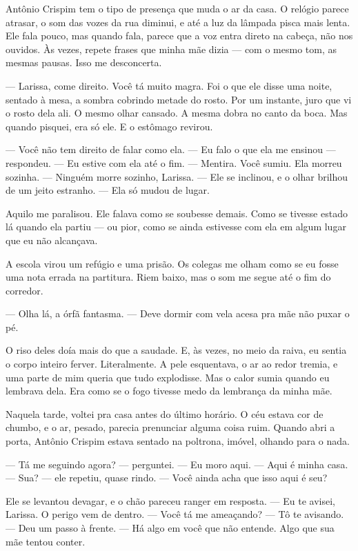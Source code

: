 Antônio Crispim tem o tipo de presença que muda o ar da casa.  
O relógio parece atrasar, o som das vozes da rua diminui, e até a luz da lâmpada pisca mais lenta.  
Ele fala pouco, mas quando fala, parece que a voz entra direto na cabeça, não nos ouvidos.  
Às vezes, repete frases que minha mãe dizia — com o mesmo tom, as mesmas pausas.  
Isso me desconcerta.

— Larissa, come direito. Você tá muito magra.  
Foi o que ele disse uma noite, sentado à mesa, a sombra cobrindo metade do rosto.  
Por um instante, juro que vi o rosto dela ali.  
O mesmo olhar cansado.  
A mesma dobra no canto da boca.  
Mas quando pisquei, era só ele.  
E o estômago revirou.

— Você não tem direito de falar como ela.  
— Eu falo o que ela me ensinou — respondeu. — Eu estive com ela até o fim.  
— Mentira. Você sumiu. Ela morreu sozinha.  
— Ninguém morre sozinho, Larissa. — Ele se inclinou, e o olhar brilhou de um jeito estranho. — Ela só mudou de lugar.  

Aquilo me paralisou.  
Ele falava como se soubesse demais.  
Como se tivesse estado lá quando ela partiu — ou pior, como se ainda estivesse com ela em algum lugar que eu não alcançava.

\medskip

A escola virou um refúgio e uma prisão.  
Os colegas me olham como se eu fosse uma nota errada na partitura.  
Riem baixo, mas o som me segue até o fim do corredor.

— Olha lá, a órfã fantasma.  
— Deve dormir com vela acesa pra mãe não puxar o pé.

O riso deles doía mais do que a saudade.  
E, às vezes, no meio da raiva, eu sentia o corpo inteiro ferver.  
Literalmente.  
A pele esquentava, o ar ao redor tremia, e uma parte de mim queria que tudo explodisse.  
Mas o calor sumia quando eu lembrava dela.  
Era como se o fogo tivesse medo da lembrança da minha mãe.

Naquela tarde, voltei pra casa antes do último horário.  
O céu estava cor de chumbo, e o ar, pesado, parecia prenunciar alguma coisa ruim.  
Quando abri a porta, Antônio Crispim estava sentado na poltrona, imóvel, olhando para o nada.

— Tá me seguindo agora? — perguntei.  
— Eu moro aqui.  
— Aqui é minha casa.  
— Sua? — ele repetiu, quase rindo. — Você ainda acha que isso aqui é seu?

Ele se levantou devagar, e o chão pareceu ranger em resposta.  
— Eu te avisei, Larissa. O perigo vem de dentro.  
— Você tá me ameaçando?  
— Tô te avisando. — Deu um passo à frente. — Há algo em você que não entende. Algo que sua mãe tentou conter.

